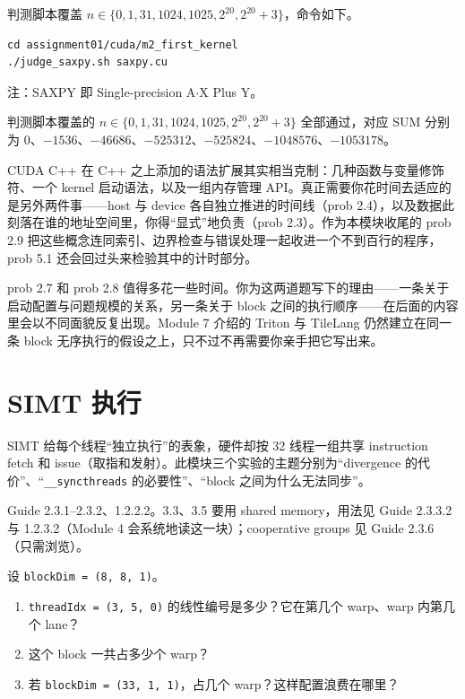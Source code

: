\documentclass[11pt,a4paper,fontset=fandol]{ctexart}
\begin{document}
判测脚本覆盖 $n \in \{0, 1, 31, 1024, 1025, 2^{20}, 2^{20}{+}3\}$，命令如下。

\begin{lstlisting}
cd assignment01/cuda/m2_first_kernel
./judge_saxpy.sh saxpy.cu
\end{lstlisting}

注：SAXPY 即 Single-precision A$\cdot$X Plus Y。

\begin{answer}
判测脚本覆盖的
$n\in\{0,1,31,1024,1025,2^{20},2^{20}+3\}$ 全部通过，对应 SUM 分别为
0、$-1536$、$-46686$、$-525312$、$-525824$、$-1048576$、$-1053178$。
\end{answer}

\begin{lookback}
CUDA C++ 在 C++ 之上添加的语法扩展其实相当克制：几种函数与变量修饰符、一个 kernel 启动语法，以及一组内存管理 API。真正需要你花时间去适应的是另外两件事——host 与 device 各自独立推进的时间线（prob 2.4），以及数据此刻落在谁的地址空间里，你得“显式”地负责（prob 2.3）。作为本模块收尾的 prob 2.9 把这些概念连同索引、边界检查与错误处理一起收进一个不到百行的程序，prob 5.1 还会回过头来检验其中的计时部分。

prob 2.7 和 prob 2.8 值得多花一些时间。你为这两道题写下的理由——一条关于启动配置与问题规模的关系，另一条关于 block 之间的执行顺序——在后面的内容里会以不同面貌反复出现。Module 7 介绍的 Triton 与 TileLang 仍然建立在同一条 block 无序执行的假设之上，只不过不再需要你亲手把它写出来。
\end{lookback}

\section{SIMT 执行}

SIMT 给每个线程“独立执行”的表象，硬件却按 32 线程一组共享 instruction fetch 和 issue（取指和发射）。此模块三个实验的主题分别为“divergence 的代价”、“\texttt{\_\_syncthreads} 的必要性”、“block 之间为什么无法同步”。

\begin{reading}
Guide 2.3.1--2.3.2、1.2.2.2。3.3、3.5 要用 shared memory，用法见 Guide 2.3.3.2 与 1.2.3.2（Module 4 会系统地读这一块）；cooperative groups 见 Guide 2.3.6（只需浏览）。
\end{reading}

设 \texttt{blockDim = (8, 8, 1)}。
\begin{enumerate}[label=(\alph*)]
  \item \texttt{threadIdx = (3, 5, 0)} 的线性编号是多少？它在第几个 warp、warp 内第几个 lane？
  \item 这个 block 一共占多少个 warp？
  \item 若 \texttt{blockDim = (33, 1, 1)}，占几个 warp？这样配置浪费在哪里？
\end{enumerate}
\end{document}
